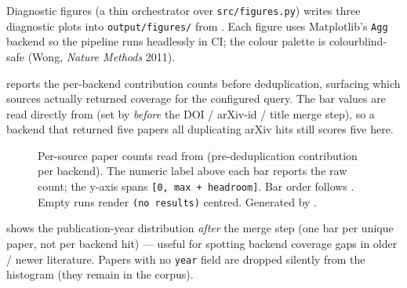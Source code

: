 \documentclass[
  ignorenonframetext,
]{beamer}
\makeatletter
\newcommand*\pandocbounded[1]{%
  \sbox\pandoc@box{#1}%
  \Gscale@div\@tempa{\textheight}{\dimexpr\ht\pandoc@box+\dp\pandoc@box\relax}%
  \Gscale@div\@tempb{\linewidth}{\wd\pandoc@box}%
  \ifdim\@tempb\p@<\@tempa\p@\let\@tempa\@tempb\fi%
  \ifdim\@tempa\p@<\p@\scalebox{\@tempa}{\usebox\pandoc@box}%
  \else\usebox{\pandoc@box}%
  \fi%
}
\makeatother
\begin{document}
\begin{frame}{Diagnostic figures}
\protect{}\label{diagnostic-figures}
 (a thin orchestrator
over \texttt{src/figures.py}) writes three diagnostic plots into
\texttt{output/figures/} from . Each
figure uses Matplotlib's \texttt{Agg} backend so the pipeline runs
headlessly in CI; the colour palette is colourblind-safe (Wong,
\emph{Nature Methods} 2011).

 reports the per-backend contribution
counts before deduplication, surfacing which sources actually returned
coverage for the configured query. The bar values are read directly from
 (set by
 \emph{before} the DOI / arXiv-id / title merge
step), so a backend that returned five papers all duplicating arXiv hits
still scores five here.

\begin{figure}
\centering
\pandocbounded{\includegraphics[keepaspectratio,alt={Per-source paper counts read from SearchResult.per\_source\_counts (pre-deduplication contribution per backend). The numeric label above each bar reports the raw count; the y-axis spans {[}0, max + headroom{]}. Bar order follows project\_config.search.sources. Empty runs render (no results) centred. Generated by src/figures.py::plot\_papers\_per\_source.}]{../figures/papers_per_source.png}}
\caption{Per-source paper counts read from
\protect{} (pre-deduplication
contribution per backend). The numeric label above each bar reports the
raw count; the y-axis spans \protect\texttt{{[}0,\ max\ +\ headroom{]}}.
Bar order follows \protect{}. Empty
runs render \protect\texttt{(no\ results)} centred. Generated by
\protect{}.}\label{fig:papers_per_source}
\end{figure}

 shows the publication-year distribution
\emph{after} the merge step (one bar per unique paper, not per backend
hit) --- useful for spotting backend coverage gaps in older / newer
literature. Papers with no \texttt{year} field are dropped silently from
the histogram (they remain in the corpus).


\end{frame}
\end{document}
